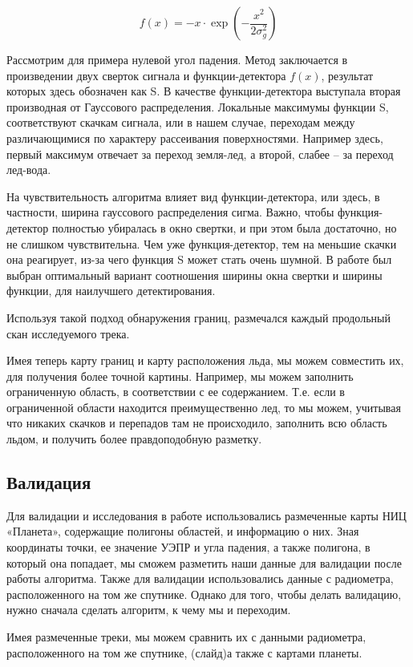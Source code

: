\begin{equation}
  f(x) = -x\cdot \exp(-\frac{x^2}{2\sigma^2_g})
  \label{eq:fx}
\end{equation}

Рассмотрим для примера нулевой угол падения. Метод заключается в произведении двух сверток сигнала и
функции-детектора $f(x)$, результат которых здесь обозначен как S. В качестве функции-детектора выступала вторая производная от
Гауссового распределения.  Локальные максимумы функции S, соответствуют скачкам сигнала, или в нашем случае, переходам
между различающимися по характеру рассеивания поверхностями. Например здесь, первый максимум отвечает за переход
земля-лед, а второй, слабее – за переход лед-вода. 

На чувствительность алгоритма влияет вид функции-детектора, или здесь, в частности, ширина гауссового распределения
сигма. Важно, чтобы функция-детектор полностью убиралась в окно свертки, и при этом была достаточно, но не слишком
чувствительна. Чем уже функция-детектор, тем на меньшие скачки она реагирует, из-за чего функция S может стать очень
шумной. В работе был выбран оптимальный вариант соотношения ширины окна свертки и ширины функции, для наилучшего
детектирования. 

Используя такой подход обнаружения границ, размечался каждый продольный скан исследуемого трека. 

Имея теперь карту границ и карту расположения льда, мы можем совместить их, для получения более точной картины.
Например, мы можем заполнить ограниченную область, в соответствии с ее содержанием. Т.е. если в ограниченной области
находится преимущественно лед, то мы можем, учитывая что никаких скачков и перепадов там не происходило, заполнить всю
область льдом, и получить более правдоподобную разметку.

\subsection{Валидация}
Для валидации и исследования в работе использовались размеченные карты НИЦ «Планета», содержащие полигоны областей, и
информацию о них. Зная координаты точки, ее значение УЭПР и угла падения, а также полигона, в который она попадает, мы
сможем разметить наши данные для валидации после работы алгоритма. Также для валидации использовались данные с
радиометра, расположенного на том же спутнике. Однако для того, чтобы делать валидацию, нужно сначала сделать алгоритм,
к чему мы и переходим.  

Имея размеченные треки, мы можем сравнить их с данными радиометра, расположенного на том же спутнике, (слайд)а также с
картами планеты.

